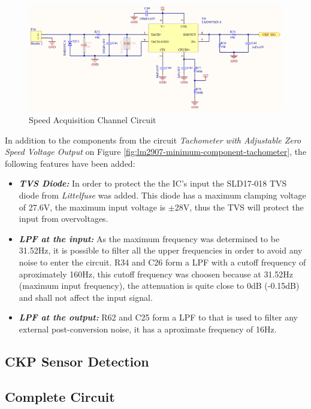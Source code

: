 			\begin{figure}[htbp]
				\centering
					\includegraphics[scale=0.6]{figuras/fig-ckp-conditioning-circuit.png}
				\caption{Speed Acquisition Channel Circuit \cite{ckp-conditioning-circuit}}
				\label{fig:ckp-conditioning-circuit}
			\end{figure}

			In addition to the components from the circuit \textit{Tachometer with Adjustable Zero Speed Voltage Output} on Figure \ref{fig:lm2907-minimum-component-tachometer}, the following features have been added:

			\begin{itemize}
				\item\textit{\textbf{TVS Diode:}} In order to protect the the IC's input the SLD17-018 TVS diode from \textit{Littelfuse} was added. This diode has a maximum clamping voltage of 27.6V, the maximum input voltage is $\pm$28V, thus the TVS will protect the input from overvoltages.\label{itm:ckp-circuit-tvs}
				\item\textit{\textbf{LPF at the input:}} As the maximum frequency was determined to be 31.52Hz, it is possible to filter all the upper frequencies in order to avoid any noise to enter the circuit. R34 and C26 form a LPF with a cutoff frequency of aproximately 160Hz, this cutoff frequency was choosen because at 31.52Hz (maximum input frequency), the attenuation is quite close to 0dB (-0.15dB) and shall not affect the input signal.\label{itm:ckp-circuit-lpf-input}
				\item\textit{\textbf{LPF at the output:}} R62 and C25 form a LPF to that is used to filter any external post-conversion noise, it has a aproximate frequency of 16Hz.\label{itm:ckp-circuit-lpf-output} 
			\end{itemize}


	\subsection{CKP Sensor Detection}\label{ssec:ckp-sensor-detection-circuit}

	\subsection{Complete Circuit}\label{ssec:spd-acq-complete-circuit}
